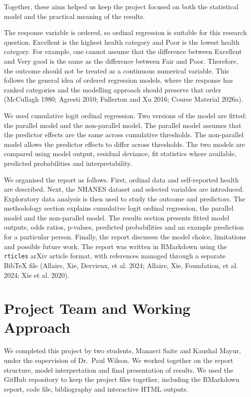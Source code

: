 \documentclass{article}
\begin{document}
Together, these aims helped us keep the project focused on both the
statistical model and the practical meaning of the results.

The response variable is ordered, so ordinal regression is suitable for
this research question. Excellent is the highest health category and
Poor is the lowest health category. For example, one cannot assume that
the difference between Excellent and Very good is the same as the
difference between Fair and Poor. Therefore, the outcome should not be
treated as a continuous numerical variable. This follows the general
idea of ordered regression models, where the response has ranked
categories and the modelling approach should preserve that order
(McCullagh 1980; Agresti 2010; Fullerton and Xu 2016; Course Material
2026a).

We used cumulative logit ordinal regression. Two versions of the model
are fitted: the parallel model and the non-parallel model. The parallel
model assumes that the predictor effects are the same across cumulative
thresholds. The non-parallel model allows the predictor effects to
differ across thresholds. The two models are compared using model
output, residual deviance, fit statistics where available, predicted
probabilities and interpretability.

We organised the report as follows. First, ordinal data and
self-reported health are described. Next, the NHANES dataset and
selected variables are introduced. Exploratory data analysis is then
used to study the outcome and predictors. The methodology section
explains cumulative logit ordinal regression, the parallel model and the
non-parallel model. The results section presents fitted model outputs,
odds ratios, p-values, predicted probabilities and an example prediction
for a particular person. Finally, the report discusses the model choice,
limitations and possible future work. The report was written in
RMarkdown using the \texttt{rticles} arXiv article format, with
references managed through a separate BibTeX file (Allaire, Xie,
Dervieux, et al. 2024; {Allaire, Xie, Foundation, et al.} 2024; Xie et
al. 2020).

\section{Project Team and Working
Approach}\label{project-team-and-working-approach}

We completed this project by two students, Manasvi Saite and Kaushal
Mayur, under the supervision of Dr.~Paul Wilson. We worked together on
the report structure, model interpretation and final presentation of
results. We used the GitHub repository to keep the project files
together, including the RMarkdown report, code file, bibliography and
interactive HTML outputs.
\end{document}
